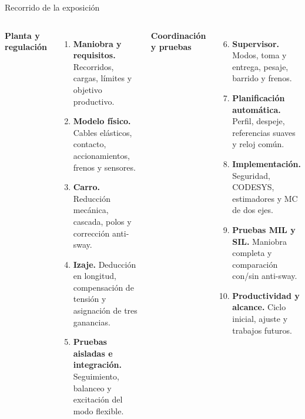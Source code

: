 \documentclass[aspectratio=169,11pt]{beamer}
\begin{document}
\begin{frame}[t,label=slide2]{Recorrido de la exposición}
\relax
\begin{columns}[T,onlytextwidth]\fontsize{9.2}{11.2}\selectfont\textbf{Planta y regulación}\par\begin{enumerate}
\item \textbf{Maniobra y requisitos.} Recorridos, cargas, límites y objetivo productivo.
\item \textbf{Modelo físico.} Cables elásticos, contacto, accionamientos, frenos y sensores.
\item \textbf{Carro.} Reducción mecánica, cascada, polos y corrección anti-sway.
\item \textbf{Izaje.} Deducción en longitud, compensación de tensión y asignación de tres ganancias.
\item \textbf{Pruebas aisladas e integración.} Seguimiento, balanceo y excitación del modo flexible.
\end{enumerate}\fontsize{9.2}{11.2}\selectfont\textbf{Coordinación y pruebas}\par\begin{enumerate}
\setcounter{enumi}{5}
\item \textbf{Supervisor.} Modos, toma y entrega, pesaje, barrido y frenos.
\item \textbf{Planificación automática.} Perfil, despeje, referencias suaves y reloj común.
\item \textbf{Implementación.} Seguridad, CODESYS, estimadores y MC de dos ejes.
\item \textbf{Pruebas MIL y SIL.} Maniobra completa y comparación con/sin anti-sway.
\item \textbf{Productividad y alcance.} Ciclo inicial, ajuste y trabajos futuros.
\end{enumerate}\end{columns}
\end{frame}
\end{document}
